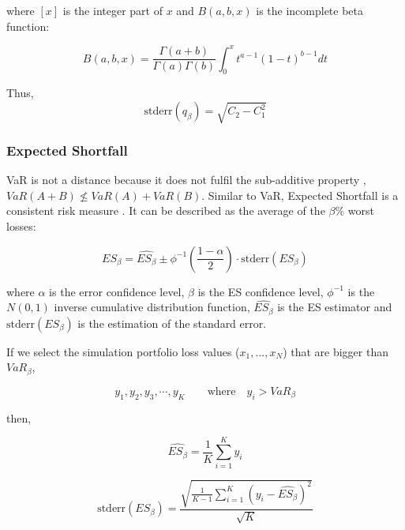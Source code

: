 \documentclass[a4paper,12pt,final]{article}
\begin{document}
where $[x]$ is the integer part of $x$ and $B(a,b,x)$ is the incomplete beta 
function:

\begin{displaymath}
B(a,b,x)=\frac{\Gamma(a+b)}{\Gamma(a)\Gamma(b)}\int_0^x t^{a-1} (1-t)^{b-1} dt
\end{displaymath}

Thus,
\begin{displaymath}
\textrm{stderr}(q_{\beta}) = \sqrt{C_2 - C_1^2}
\end{displaymath}

\subsubsection{Expected Shortfall}
VaR is not a distance because it does not fulfil the sub-additive property 
\cite{var:varbad}, $VaR(A+B) \nleq VaR(A)+VaR(B)$. Similar to VaR, Expected 
Shortfall is a consistent risk measure \cite{var:eshortfall}. It can be described
as the average of the $\beta\%$ worst losses:

\begin{displaymath}
ES_{\beta} = \widehat{ES_{\beta}} \pm \phi^{-1}\left(\frac{1-\alpha}{2}\right) \cdot \textrm{stderr}(ES_{\beta})
\end{displaymath}

where $\alpha$ is the error confidence level, $\beta$ is the ES confidence 
level, $\phi^{-1}$ is the $N(0,1)$ inverse cumulative distribution function, 
$\widehat{ES_{\beta}}$ is the ES estimator and $\textrm{stderr}(ES_{\beta})$
is the estimation of the standard error.
\newline

If we select the simulation portfolio loss values ($x_1, ..., x_N$) that are bigger 
than $VaR_{\beta}$,

\begin{displaymath}
y_1, y_2, y_3, \cdots, y_K \qquad \textrm{where} \quad y_i > VaR_{\beta}
\end{displaymath}

then,

\begin{displaymath}
\widehat{ES_{\beta}} = \frac{1}{K} \sum_{i=1}^{K} y_i
\end{displaymath}

\begin{displaymath}
\textrm{stderr}(ES_{\beta}) =
\frac{\sqrt{\frac{1}{K-1} \sum_{i=1}^{K} \left( y_i - \widehat{ES_{\beta}} \right)^2}}{\sqrt{K}}
\end{displaymath}
\end{document}
